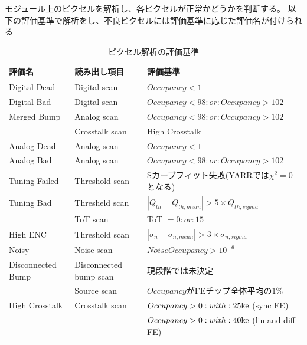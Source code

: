 モジュール上のピクセルを解析し、各ピクセルが正常かどうかを判断する。
以下の評価基準で解析をし、不良ピクセルには評価基準に応じた評価名が付けられる

\begin{table}[tbp]
\begin{center}
\caption[ピクセル解析の評価基準]{ピクセル解析の評価基準\cite{3-1}}
\label{pixel_analysis_criteria}
  \begin{tabular}{|lll|} \hline
    評価名 & 読み出し項目 & 評価基準 \\ \hline
    Digital Dead      & Digital scan           & $Occupancy < 1$ \\ \hline
    Digital Bad       & Digital scan           & $Occupancy < 98 :or :Occupancy > 102$ \\\hline 
    Merged Bump       & Analog scan            & $Occupancy < 98 :or :Occupancy > 102$  \\ 
                      & Crosstalk scan         & High Crosstalk\\ \hline
    Analog Dead       & Analog scan            & $Occupancy < 1$ \\ \hline
    Analog Bad        & Analog scan            & $Occupancy < 98 :or :Occupancy > 102$ \\ \hline
    Tuning Failed     & Threshold scan         & Sカーブフィット失敗(YARRでは$\chi^2=0$となる) \\ \hline
    Tuning Bad        & Thresheld scan         & $|Q_{th}-Q_{th,mean}| > 5 \times Q_{th,sigma}$ \\ 
                      & ToT scan               & ToT $ = 0 :or :15 $\\ \hline
    High ENC          & Threshold scan         & $|\sigma_{n}-\sigma_{n,mean}| > 3 \times \sigma_{n,sigma}$\\ \hline
    Noisy             & Noise scan             & $NoiseOccupancy > 10^{-6}$\\ \hline
    Disconnected Bump & Disconnected bump scan & 現段階では未決定 \\ 
                      & Source scan            & $Occupancy$がFEチップ全体平均の$1\%$ \\ \hline
    High Crosstalk    & Crosstalk scan         & $Occupancy>0 :with :25{\rm ke}$ (sync FE)\\
                      &                        & $Occupancy>0 :with :40{\rm ke}$ (lin and diff FE)\\ \hline 
  \end{tabular}
\end{center}
\end{table}

